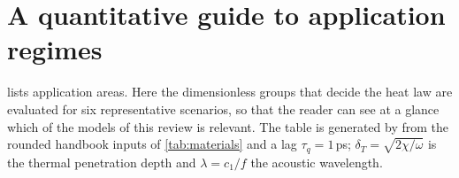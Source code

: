 \section{A quantitative guide to application regimes}\label{sec:scenarios}

 lists application areas. Here the dimensionless groups that decide the heat law are evaluated for six representative scenarios, so that the reader can see at a glance which of the models of this review is relevant. The table is generated by  from the rounded handbook inputs of \cref{tab:materials} and a lag $\tau_q=1$\,ps; $\delta_T=\sqrt{2\chi/\omega}$ is the thermal penetration depth and $\lambda=c_1/f$ the acoustic wavelength.

\begin{table}[ht]\centering\scriptsize
\caption{Dimensionless groups for six scenarios ($T_0=300$\,K, $\tau_q=1$\,ps). The assessment column applies the rule: Fourier is adequate if $\omega\tau_q<0.1$ and $\omega/\omega_*<0.1$; a lag law may matter if $\omega\tau_q<1.5$ but then the kinetic validity of the model must be checked; otherwise the continuum heat law itself is questionable.}\label{tab:scenarios}

\end{table}

